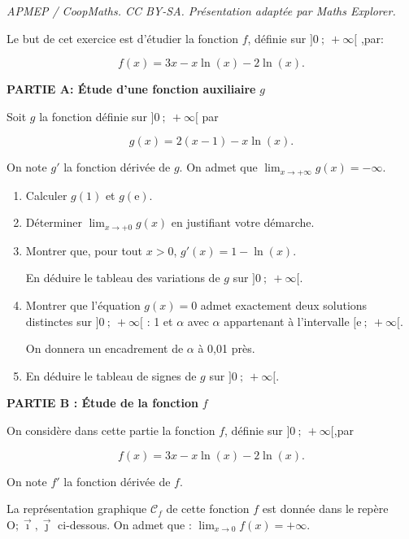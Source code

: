 \documentclass[10pt]{article}
\providecommand{\Oij}{\(\mathrm{O};\vec{\imath},\vec{\jmath}\)}
\begin{document}
\noindent\textit{APMEP / CoopMaths. CC BY-SA. Présentation adaptée par Maths Explorer.}\par\medskip
\medskip

Le but de cet exercice est d'étudier la fonction $f$, définie sur $]0~;~ +\infty[$ ,par:

\[f(x) =3x - x \ln (x) - 2 \ln (x).\]

\smallskip

\textbf{PARTIE A: Étude d'une fonction auxiliaire }\boldmath $g$ \unboldmath

\medskip

Soit $g$ la fonction définie sur $]0~;~ +\infty[$ par 

\[g(x) = 2(x - 1) - x \ln (x).\]

On note $g'$ la fonction dérivée de $g$. On admet que $\displaystyle\lim_{x \to + \infty} g(x) = - \infty$.

\medskip

\begin{enumerate}
\item Calculer $g(1)$ et $g(\text{e})$.
\item Déterminer $\displaystyle\lim_{x \to + 0} g(x)$ en justifiant votre démarche.
\item Montrer que, pour tout $x > 0$,\: $g'(x) = 1 - \ln (x)$.

En déduire le tableau des variations de $g$ sur $]0~;~ +\infty[$.
\item Montrer que l'équation $g(x) = 0$ admet exactement deux solutions distinctes sur
$]0~;~ +\infty[$ : 1 et $\alpha$ avec $\alpha$ appartenant à l'intervalle $[\text{e}~;~+\infty[$.

On donnera un encadrement de $\alpha$ à 0,01 près.
\item En déduire le tableau de signes de $g$ sur $]0~;~ +\infty[$. 
\end{enumerate}

\bigskip

\textbf{PARTIE B : Étude de la fonction} \boldmath $f$ \unboldmath

\medskip

On considère dans cette partie la fonction $f$, définie sur $]0~;~ +\infty[$,par 

\[f(x) = 3x - x \ln (x)- 2\ln (x).\]

On note $f'$ la fonction dérivée de $f$.

La représentation graphique $\mathcal{C}_f$ de cette fonction $f$ est donnée dans le repère \Oij{} ci-dessous. On admet que : $\displaystyle\lim_{x \to 0}f(x) = + \infty$.
\end{document}
